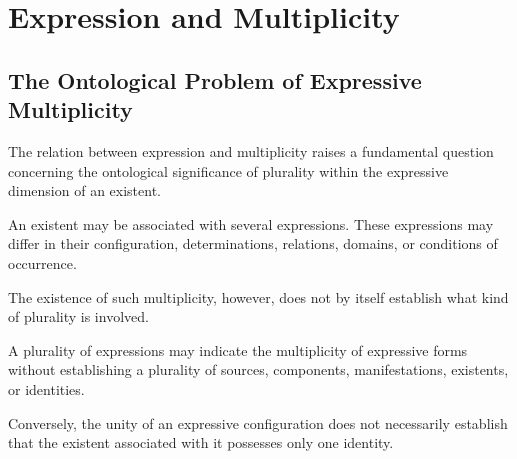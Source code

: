 %
%

\section{Expression and Multiplicity}
\label{sec:expression-and-multiplicity}

\subsection{The Ontological Problem of Expressive Multiplicity}

The relation between expression and multiplicity
raises a fundamental question concerning the
ontological significance of plurality within
the expressive dimension of an existent.

An existent may be associated with several expressions.
These expressions may differ in their configuration,
determinations, relations, domains, or conditions
of occurrence.

The existence of such multiplicity, however,
does not by itself establish what kind of plurality
is involved.

A plurality of expressions may indicate the
multiplicity of expressive forms without establishing
a plurality of sources, components, manifestations,
existents, or identities.

Conversely, the unity of an expressive configuration
does not necessarily establish that the existent
associated with it possesses only one identity.

